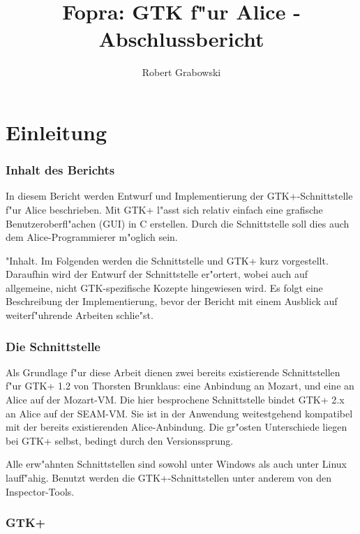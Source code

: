 \documentclass{article}
\begin{document}
\title{Fopra: GTK f"ur Alice - Abschlussbericht}
\author{Robert Grabowski}
\maketitle

\tableofcontents

\part{Einleitung}

\section{Inhalt des Berichts}

In diesem Bericht werden Entwurf und Implementierung der 
GTK+-Schnittstelle f"ur Alice beschrieben. Mit GTK+ l"asst sich relativ einfach
eine grafische Benutzeroberfl"achen (GUI) in C erstellen. 
Durch die Schnittstelle soll
dies auch dem Alice-Programmierer m"oglich sein.

"Inhalt. Im Folgenden werden die Schnittstelle und GTK+ kurz vorgestellt.
Daraufhin wird der Entwurf der Schnittstelle er"ortert, wobei auch auf
allgemeine, nicht GTK-spezifische Kozepte hingewiesen wird.
Es folgt eine Beschreibung der Implementierung, bevor der Bericht mit einem
Ausblick auf weiterf"uhrende Arbeiten schlie"st.

\section{Die Schnittstelle}

Als Grundlage f"ur diese Arbeit dienen zwei bereits existierende
Schnittstellen f"ur GTK+ 1.2 von Thorsten Brunklaus:
eine Anbindung an Mozart, und eine an Alice auf der Mozart-VM.
Die hier besprochene Schnittstelle bindet GTK+ 2.x an Alice auf der SEAM-VM.
Sie ist in der Anwendung weitestgehend kompatibel mit der bereits existierenden
Alice-Anbindung. Die gr"osten Unterschiede liegen bei GTK+ selbst,
bedingt durch den Versionssprung.

Alle erw"ahnten Schnittstellen sind sowohl unter Windows als auch unter
Linux lauff"ahig. Benutzt werden die GTK+-Schnittstellen unter anderem von
den Inspector-Tools.

\section{GTK+}
\end{document}
